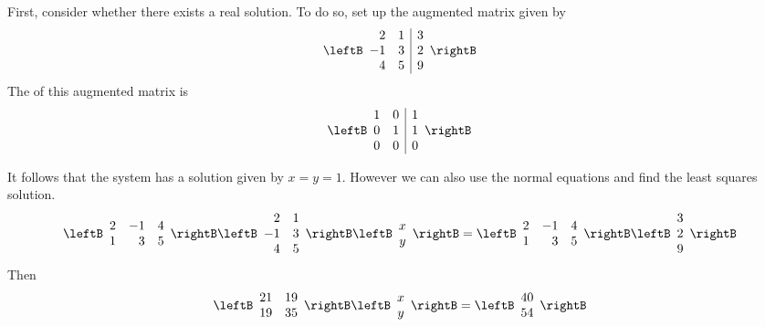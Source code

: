 \begin{solution}
First, consider whether there exists a real solution. To do so, set up the augmented matrix given by
\begin{equation*}
\leftB
\begin{array}{rr|r}
2 & 1 & 3 \\ 
-1 & 3 & 2 \\ 
4 & 5 & 9
\end{array}
\rightB
\end{equation*}
The {\rref} of this augmented matrix is 
\begin{equation*}
\leftB
\begin{array}{rr|r}
1 & 0 & 1 \\ 
0 & 1 & 1 \\ 
0 & 0 & 0
\end{array}
\rightB
\end{equation*}

It follows that the system has a solution given by $x=y=1$. However we can also use the normal equations and find
the least squares solution. 
\begin{equation*}
\leftB 
\begin{array}{rrr}
2 & -1 & 4 \\ 
1 & 3 & 5
\end{array}
\rightB \leftB 
\begin{array}{rr}
2 & 1 \\ 
-1 & 3 \\ 
4 & 5
\end{array}
\rightB \leftB 
\begin{array}{c}
x \\ 
y
\end{array}
\rightB =\leftB 
\begin{array}{rrr}
2 & -1 & 4 \\ 
1 & 3 & 5
\end{array}
\rightB \leftB 
\begin{array}{r}
3 \\ 
2 \\ 
9
\end{array}
\rightB
\end{equation*}
Then
\begin{equation*}
\leftB 
\begin{array}{rr}
21 & 19 \\ 
19 & 35
\end{array}
\rightB \leftB 
\begin{array}{c}
x \\ 
y
\end{array}
\rightB =\leftB 
\begin{array}{c}
40 \\ 
54
\end{array}
\rightB
\end{equation*}


\end{solution}
